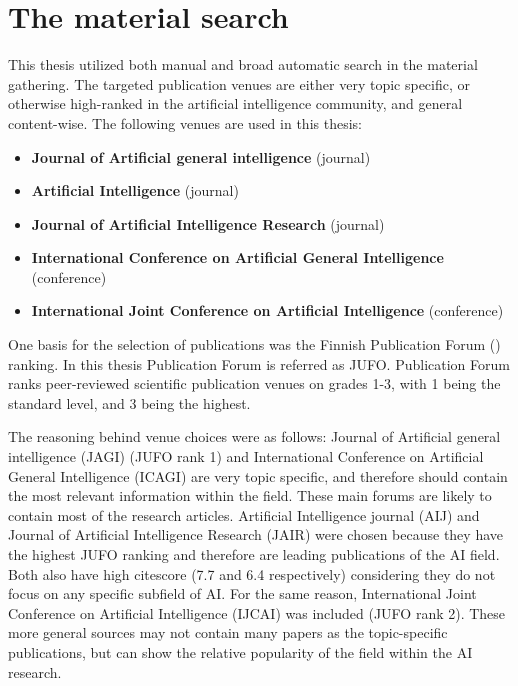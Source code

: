\documentclass[utf8,english]{gradu3}
\begin{document}
\section{The material search}

This thesis utilized both manual and broad automatic search in the material
gathering. The targeted publication venues are either very topic specific, or
otherwise high-ranked in the artificial intelligence community, and general
content-wise. The following venues are used in this thesis:

\begin{itemize}
  \item \textbf{Journal of Artificial general intelligence} (journal)
  \item \textbf{Artificial Intelligence} (journal)
  \item \textbf{Journal of Artificial Intelligence Research} (journal)
  \item \textbf{International Conference on Artificial General Intelligence}
        (conference)
  \item \textbf{International Joint Conference on Artificial Intelligence}
        (conference)
\end{itemize}

One basis for the selection of publications was the Finnish Publication Forum
(\cite{jufo}) ranking. In this thesis Publication Forum is referred as JUFO.
Publication Forum ranks peer-reviewed scientific publication venues on grades
1-3, with 1 being the standard level, and 3 being the highest.

The reasoning behind venue choices were as follows: Journal of Artificial
general intelligence (JAGI) (JUFO rank 1) and International Conference on
Artificial General Intelligence (ICAGI) are very topic specific, and therefore
should contain the most relevant information within the field. These main forums
are likely to contain most of the research articles. Artificial Intelligence
journal (AIJ) and Journal of Artificial Intelligence Research (JAIR) were chosen
because they have the highest JUFO ranking and therefore are leading
publications of the AI field. Both also have high citescore (7.7 and 6.4
respectively) considering they do not focus on any specific subfield of AI. For
the same reason, International Joint Conference on Artificial Intelligence
(IJCAI) was included (JUFO rank 2). These more general sources may not contain
many papers as the topic-specific publications, but can show the relative
popularity of the field within the AI research.
\end{document}
